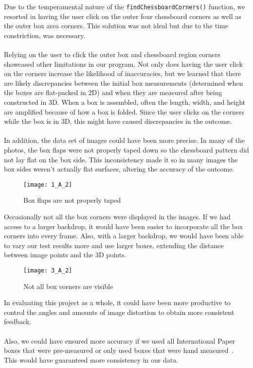 \documentclass[11pt, twoside, reqno]{book}
\begin{document}
Due to the temperamental nature of the \texttt{findChessboardCorners()} function, we resorted in having the user click on the outer four chessboard corners as well as the outer box area corners. This solution was not ideal but due to the time constriction, was necessary. 
\\ \\
Relying on the user to click the outer box and chessboard region corners showcased other limitations in our program. Not only does having the user click on the corners increase the likelihood of inaccuracies, but we learned that there are likely discrepancies between the initial box measurements (determined when the boxes are flat-packed in 2D) and when they are measured after being constructed in 3D. When a box is assembled, often the length, width, and height are amplified because of how a box is folded. Since the user clicks on the corners while the box is in 3D, this might have caused discrepancies in the outcome.\\ \\

 In addition, the data set of images could have been more precise. In many of the photos, the box flaps were not properly taped down so the chessboard pattern did not lay flat on the box side. This inconsistency made it so in many images the box sides weren't actually flat surfaces, altering the accuracy of the outcome. \\
 
 \begin{figure}
 	 \graphicspath{ {images/} }
 	
 	\texttt{[image: 1\_A\_2]} 
 	\caption{Box flaps are not properly taped}
 \end{figure}


Occasionally not all the box corners were displayed in the images. If we had access to a larger backdrop, it would have been easier to incorporate all the box corners into every frame. Also, with a larger backdrop, we would have been able to vary our test results more and use larger boxes, extending the distance between image points and the 3D points. \\
\begin{figure}[H]
	 \graphicspath{ {images/} }
		
		\texttt{[image: 3\_A\_2]} 
		\caption{Not all box corners are visible}
\end{figure}



In evaluating this project as a whole, it could have been more productive to control the angles and amounts of image distortion to obtain more consistent feedback. \\ \\
Also, we could have ensured more accuracy if we used all International Paper boxes that were pre-measured or only used boxes that were hand measured~\cite{intpaper}. This would have guaranteed more consistency in our data. 
\end{document}

